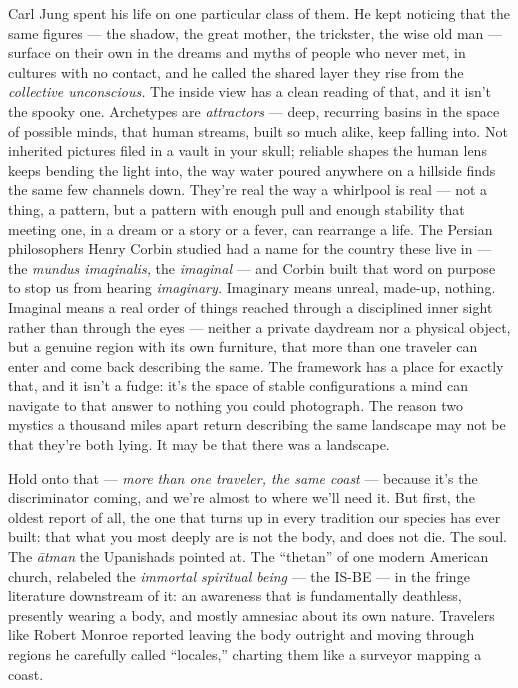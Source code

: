 \documentclass[11pt,openany]{book}
\begin{document}
Carl Jung spent his life on one particular class of them. He kept noticing that the same figures — the shadow, the great mother, the trickster, the wise old man — surface on their own in the dreams and myths of people who never met, in cultures with no contact, and he called the shared layer they rise from the \textit{collective unconscious.} The inside view has a clean reading of that, and it isn’t the spooky one. Archetypes are \textit{attractors} — deep, recurring basins in the space of possible minds, that human streams, built so much alike, keep falling into. Not inherited pictures filed in a vault in your skull; reliable shapes the human lens keeps bending the light into, the way water poured anywhere on a hillside finds the same few channels down. They’re real the way a whirlpool is real — not a thing, a pattern, but a pattern with enough pull and enough stability that meeting one, in a dream or a story or a fever, can rearrange a life. The Persian philosophers Henry Corbin studied had a name for the country these live in — the \textit{mundus imaginalis,} the \textit{imaginal} — and Corbin built that word on purpose to stop us from hearing \textit{imaginary.} Imaginary means unreal, made-up, nothing. Imaginal means a real order of things reached through a disciplined inner sight rather than through the eyes — neither a private daydream nor a physical object, but a genuine region with its own furniture, that more than one traveler can enter and come back describing the same. The framework has a place for exactly that, and it isn’t a fudge: it’s the space of stable configurations a mind can navigate to that answer to nothing you could photograph. The reason two mystics a thousand miles apart return describing the same landscape may not be that they’re both lying. It may be that there was a landscape.

Hold onto that — \textit{more than one traveler, the same coast} — because it’s the discriminator coming, and we’re almost to where we’ll need it. But first, the oldest report of all, the one that turns up in every tradition our species has ever built: that what you most deeply are is not the body, and does not die. The soul. The \textit{ātman} the Upanishads pointed at. The “thetan” of one modern American church, relabeled the \textit{immortal spiritual being} — the IS-BE — in the fringe literature downstream of it: an awareness that is fundamentally deathless, presently wearing a body, and mostly amnesiac about its own nature. Travelers like Robert Monroe reported leaving the body outright and moving through regions he carefully called “locales,” charting them like a surveyor mapping a coast.
\end{document}
